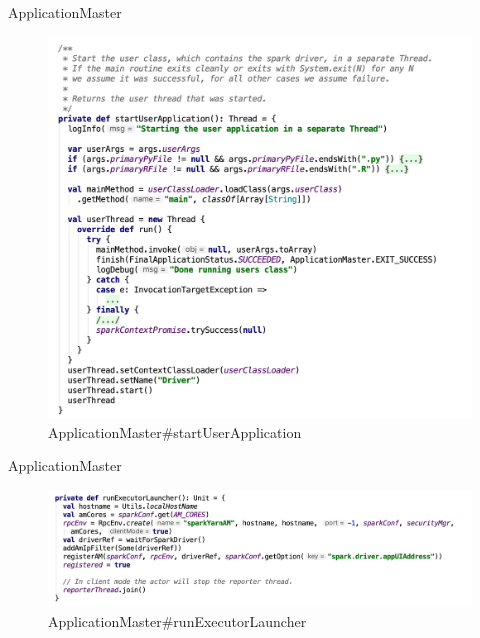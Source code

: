 \begin{frame}[plain,t]{ApplicationMaster} %
	 \\  
	\begin{figure}
		\centering
		\includegraphics[width=0.8\linewidth]{images/app004}
		\caption{ApplicationMaster\#startUserApplication}
		\label{fig:app004}
	\end{figure}
	
\end{frame}
\begin{frame}[plain,t]{ApplicationMaster} %
	 \\  \vspace{2ex}
	\begin{figure}
		\centering
		\includegraphics[width=0.9\linewidth]{images/app006}
		\caption{ApplicationMaster\#runExecutorLauncher}
		\label{fig:app006}
	\end{figure}
	
\end{frame}
